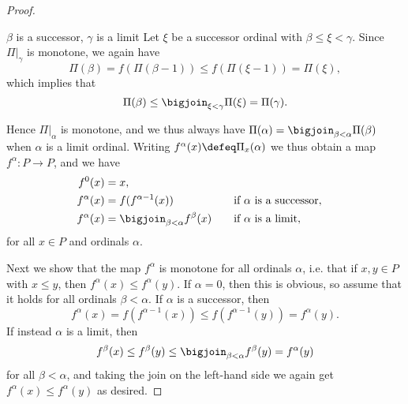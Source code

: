 \begin{proof}
\begin{proofsec}
        \item[$\beta$ is a successor, $\gamma$ is a limit]
        Let $\xi$ be a successor ordinal with $\beta \leq \xi < \gamma$. Since $\Pi|_\gamma$ is monotone, we again have
        \begin{equation*}
            \Pi(\beta)
                = f(\Pi(\beta-1))
                \leq f(\Pi(\xi-1))
                = \Pi(\xi),
        \end{equation*}
        which implies that
        \begin{equation*}
            \Pi(\beta)
                \leq \bigjoin_{\xi < \gamma} \Pi(\xi)
                = \Pi(\gamma).
        \end{equation*}
    \end{proofsec}
    Hence $\Pi|_\alpha$ is monotone, and we thus always have $\Pi(\alpha) = \bigjoin_{\beta < \alpha} \Pi(\beta)$ when $\alpha$ is a limit ordinal. Writing $f^\alpha(x) \defeq \Pi_x(\alpha)$ we thus obtain a map $f^\alpha \colon P \to P$, and we have
    \begin{alignat*}{2}
        f^0(x)
            &= x, \\
        f^\alpha(x)
            &= f(f^{\alpha-1}(x))
            \quad &&\text{if $\alpha$ is a successor}, \\
        f^\alpha(x)
            &= \bigjoin_{\beta < \alpha} f^\beta(x)
            \quad &&\text{if $\alpha$ is a limit},
    \end{alignat*}
    for all $x \in P$ and ordinals $\alpha$.

    Next we show that the map $f^\alpha$ is monotone for all ordinals $\alpha$, i.e. that if $x,y \in P$ with $x \leq y$, then $f^\alpha(x) \leq f^\alpha(y)$. If $\alpha = 0$, then this is obvious, so assume that it holds for all ordinals $\beta < \alpha$. If $\alpha$ is a successor, then
    \begin{equation*}
        f^\alpha(x)
            = f(f^{\alpha-1}(x))
            \leq f(f^{\alpha-1}(y))
            = f^\alpha(y).
    \end{equation*}
    If instead $\alpha$ is a limit, then
    \begin{equation*}
        f^\beta(x)
            \leq f^\beta(y)
            \leq \bigjoin_{\beta < \alpha} f^\beta(y)
            = f^\alpha(y)
    \end{equation*}
    for all $\beta < \alpha$, and taking the join on the left-hand side we again get $f^\alpha(x) \leq f^\alpha(y)$ as desired.
\end{proof}


